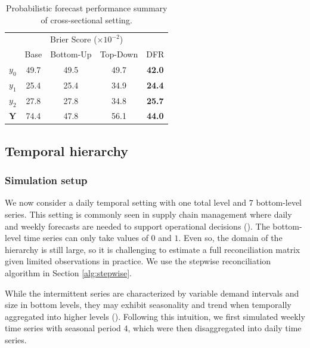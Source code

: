 \documentclass[a4paper,review,12pt,authoryear]{elsarticle}
\newcommand{\bY}{\mathbf{Y}}
\begin{document}
     
     \begin{table}
       \centering
       \caption{\label{tab:sim_crosssectional_res_dist} Probabilistic forecast performance summary of cross-sectional setting.}
       \begin{tabular}{lcccc}
       \toprule
       \multicolumn{5}{c}{Brier Score ($\times 10^{-2}$)}\\ 
        & Base & Bottom-Up & Top-Down & DFR \\\midrule
       $y_0$ & 49.7 & 49.5 & 49.7 & \textbf{42.0} \\
       $y_1$ & 25.4 & 25.4 & 34.9 & \textbf{24.4} \\
       $y_2$ & 27.8 & 27.8 & 34.8 & \textbf{25.7}\\
       $\bY$ & 74.4 & 47.8 & 56.1 & \textbf{44.0} \\
       \bottomrule
       \end{tabular} 
     \end{table}
     
     
     \subsection{Temporal hierarchy}
     
     \subsubsection{Simulation setup}
     
     We now consider a daily temporal setting with one total level and $7$ bottom-level series. 
     This setting is commonly seen in supply chain management where daily and weekly forecasts are needed to support operational decisions (\citealp{syntetosSupplyChainForecasting2016}).
     The bottom-level time series can only take values of $0$ and $1$. 
     Even so, the domain of the hierarchy is still large, so it is challenging to estimate a full reconciliation matrix given limited observations in practice. 
     We use the stepwise reconciliation algorithm in Section \ref{alg:stepwise}. 
     
     
     
     While the intermittent series are characterized by variable demand intervals and size in bottom levels, they may exhibit seasonality and trend when temporally aggregated into higher levels ().
     Following this intuition, we first simulated weekly time series with seasonal period $4$, which were then disaggregated into daily time series.
     
\end{document}
